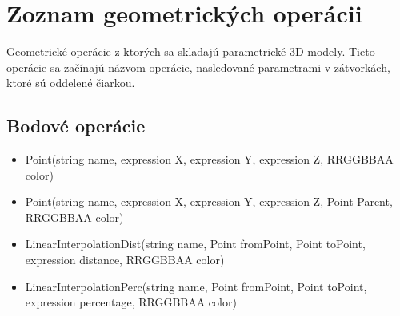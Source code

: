 \chapter{Zoznam geometrických operácii}
\label{Priloha:zoznamGeometrickychOperacii}
Geometrické operácie z ktorých sa skladajú parametrické 3D modely. Tieto operácie sa začínajú názvom operácie, nasledované parametrami v zátvorkách, ktoré sú oddelené čiarkou.

\section*{Bodové operácie}
\begin{itemize}


		\item Point(string name, expression X, expression Y, expression Z, RRGGBBAA color) 
		\item Point(string name, expression X, expression Y, expression Z, Point Parent, RRGGBBAA color) 

		\item LinearInterpolationDist(string name, Point fromPoint, Point toPoint, expression distance, RRGGBBAA color)
		
		\item LinearInterpolationPerc(string name, Point fromPoint, Point toPoint, expression percentage, RRGGBBAA color)


\end{itemize}
